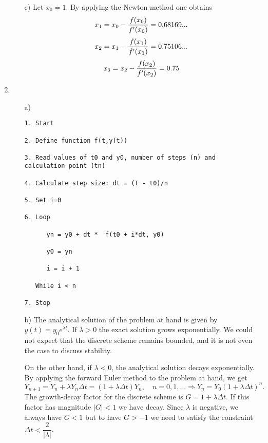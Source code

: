 \documentclass{article}
\begin{document}
\begin{enumerate}
\begin{itemize}
\item[c)] Let $x_0 = 1$. By applying the Newton method one obtains
\begin{equation*}
x_1 = x_0 - \dfrac{f(x_0)}{f'(x_0)} = 0.68169...\\
\end{equation*}
\begin{equation*}
x_2 = x_1 - \dfrac{f(x_1)}{f'(x_1)} = 0.75106...\\
\end{equation*}
\begin{equation*}
x_3 = x_2 - \dfrac{f(x_2)}{f'(x_2)} = 0.75\\
\end{equation*}

\end{itemize}
\item

\begin{itemize}
\item[a)] 
\small
\begin{verbatim}
1. Start

2. Define function f(t,y(t))

3. Read values of t0 and y0, number of steps (n) and calculation point (tn)
   
4. Calculate step size: dt = (T - t0)/n

5. Set i=0

6. Loop 
      
      yn = y0 + dt *  f(t0 + i*dt, y0)
      
      y0 = yn
      
      i = i + 1

   While i < n

7. Stop
\end{verbatim}

\item[b)] The analytical solution of the problem at hand is given by $y(t) = y_0 e^{\lambda t}$. If $\lambda > 0$ the exact solution grows exponentially. We could not expect that the discrete scheme remains bounded, and it is not even the case to discuss stability.

On the other hand, if $\lambda < 0$, the analytical solution decays exponentially. By applying the forward Euler method to the problem at hand, we get
\begin{equation*}
Y_{n+1} = Y_{n} + \lambda Y_n \Delta t = (1 + \lambda \Delta t) Y_n, \quad n = 0, 1, \dots \Rightarrow Y_{n} = Y_0 (1 + \lambda \Delta t)^n.
\end{equation*}
The growth-decay factor for the discrete scheme is $G = 1 + \lambda \Delta t$. If this factor has magnitude $|G| < 1$ we have decay. Since $\lambda$ is negative, we always have $G < 1$ but to have $G > -1$ we need to satisfy the constraint $\Delta t < \dfrac{2}{|\lambda|}$.


\end{itemize}
\end{enumerate}
\end{document}

